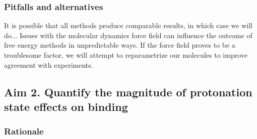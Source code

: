 \documentclass[10pt,final]{article}
\begin{document}
\subsubsection*{Pitfalls and alternatives}

It is possible that all methods produce comparable results, in which case we will do... 
Issues with the molecular dynamics force field can influence the outcome of free energy methods in unpredictable ways. If the force field proves to be a troublesome factor, we will attempt to reparametrize our molecules to improve agreement with experiments.

\subsection*{Aim 2. Quantify the magnitude of protonation state effects on binding}
\subsubsection*{Rationale}
\end{document}
